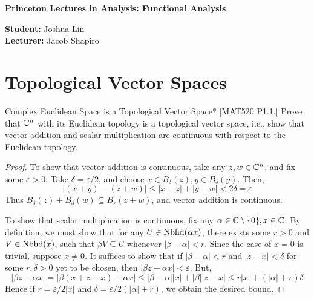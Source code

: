 





\begin{Large}
    \textsf{\textbf{Princeton Lectures in Analysis: Functional Analysis}}
\end{Large}

\vspace{1ex}

\textsf{\textbf{Student:}} Joshua Lin \\
\textsf{\textbf{Lecturer:}} Jacob Shapiro

\vspace{2ex}

\section{Topological Vector Spaces}

\begin{problem}{Complex Euclidean Space is a Topological Vector Space}*
    [MAT520 P1.1.] Prove that \(\mathbb{C}^n\) with its Euclidean topology is a topological vector space, i.e., show that vector addition and scalar multiplication are continuous with respect to the Euclidean topology. 
\end{problem}

\begin{proof}
    To show that vector addition is continuous, take any \(z, w \in \mathbb{C}^n\), and fix some \(\varepsilon > 0\). Take \(\delta = \varepsilon / 2\), and choose \(x \in B_{\delta}(z), y \in B_{\delta}(y)\). Then, 
    \[
        |(x + y) - (z + w)|
        \leq |x - z| + |y - w|
        < 2 \delta 
        = \varepsilon
    \]
    Thus \(B_\delta(z) + B_\delta(w) \subseteq B_\varepsilon(z+w)\), and vector addition is continuous. 
    \stdvspace

    To show that scalar multiplication is continuous, fix any \(\alpha \in \mathbb{C} \setminus \{0\}, x \in \mathbb{C}\). By definition, we must show that for any \(U \in \operatorname{Nbhd}(\alpha x)\), there exists some \(r > 0\) and \(V \in \operatorname{Nbhd}(x)\), such that \(\beta V \subseteq U\) whenever \(|\beta - \alpha| < r\). Since the case of \(x = 0\) is trivial, suppose \(x \neq 0\). It suffices to show that if \(|\beta - \alpha| < r\) and \(|z - x| < \delta\) for some \(r, \delta > 0\) yet to be chosen, then \(|\beta z - \alpha x| < \varepsilon\). But, 
    \[
        |\beta z - \alpha x| = |\beta(x + z - x) - \alpha x|
        \leq |\beta - \alpha| |x| + |\beta| |z - x|
        \leq r |x| + (|\alpha| + r) \delta
    \]
    Hence if \(r = \varepsilon / 2|x|\) and \(\delta = \varepsilon / 2 (|\alpha| + r)\), we obtain the desired bound. 
\end{proof}


